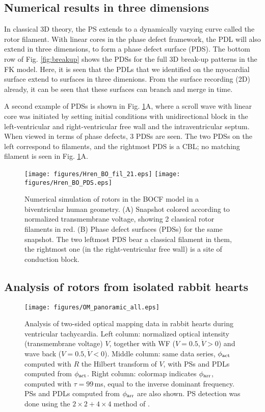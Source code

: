\documentclass{article}
\newcommand{\phiact}{\ensuremath{\phi_{\rm act}}}
\newcommand{\phiarr}{\ensuremath{\phi_{\rm arr}}}
\begin{document}
\subsection{Numerical results in three dimensions}

In classical 3D theory, the PS extends to a dynamically varying curve called the rotor filament. With linear cores in the phase defect framework, the PDL will also extend in three dimensions, to form a phase defect surface (PDS). The bottom row of Fig. \ref{fig:breakup} shows the PDSs for the full 3D break-up patterns in the FK model. Here, it is seen that the PDLs that we identified on the myocardial surface extend to surfaces in three dimenions. From the surface recording (2D) already, it can be seen that these surfaces can branch and merge in time. 

A second example of PDSs is shown in Fig. \ref{fig:3D}A, where a scroll wave with linear core was initiated by setting initial conditions with unidirectional block in the left-ventricular and right-ventricular free wall and the intraventricular septum. When viewed in terms of phase defects, 3 PDSs are seen. The two PDSs on the left correspond to filaments, and the rightmost PDS is a CBL; no matching filament is seen in Fig. \ref{fig:3D}A. 

\begin{figure}
\centering
{} 
\texttt{[image: figures/Hren\_BO\_fil\_21.eps]}
\texttt{[image: figures/Hren\_BO\_PDS.eps]}
\caption{
Numerical simulation of rotors in the BOCF model in a biventricular human geometry. (A) Snapshot colored according to normalized transmembrane voltage, showing 2 classical rotor filaments in red. (B) Phase defect surfaces (PDSs) for the same snapshot. The two leftmost PDS bear a classical filament in them, the rightmost one (in the right-ventricular free wall) is a site of conduction block. 
\label{fig:3D} }
\end{figure}

\subsection{Analysis of rotors from isolated rabbit hearts}
\label{sec:experiment}

\begin{figure*}[t]%
\centering
\texttt{[image: figures/OM\_panoramic\_all.eps]}
\caption{Analysis of two-sided optical mapping data in rabbit hearts during ventricular tachycardia. Left column: normalized optical intensity (transmembrane voltage) $V$, together with WF ($V=0.5, \dot{V}>0$) and wave back ($V=0.5, \dot{V} < 0$). Middle column: same data series, $\phiact$ computed with $R$ the Hilbert transform of $V$, with PSs and PDLs computed from $\phiact$. Right column: colormap indicates $\phiarr$, computed with $\tau = 99$\,ms, equal to the inverse dominant frequency. PSs and PDLs computed from $\phiarr$ are also shown. PS detection was done using the $2\times 2 + 4\times 4$ method of \citep{Kuklik:2017}. 
\label{fig:experiments}
}
\end{figure*}
\end{document}
